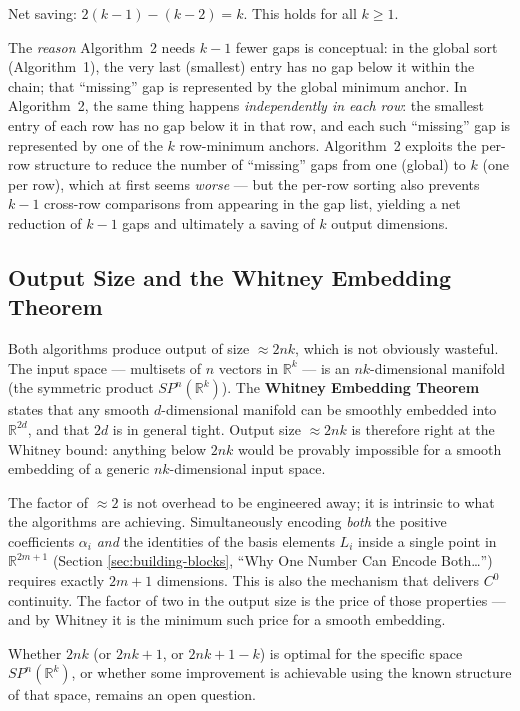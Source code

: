 \documentclass[11pt,a4paper]{article}
\newcommand{\R}{\mathbb{R}}
\begin{document}
\noindent
Net saving: $2(k-1) - (k-2) = k$.  This holds for all $k \ge 1$.

\medskip
\noindent
The \emph{reason} Algorithm~2 needs $k{-}1$ fewer gaps is conceptual: in the
global sort (Algorithm~1), the very last (smallest) entry has no gap below it
within the chain; that ``missing'' gap is represented by the global minimum
anchor.  In Algorithm~2, the same thing happens \emph{independently in each
row}: the smallest entry of each row has no gap below it in that row,
and each such ``missing'' gap is represented by one of the $k$ row-minimum
anchors.  Algorithm~2 exploits the per-row structure to reduce the number of
``missing'' gaps from one (global) to $k$ (one per row), which at first
seems \emph{worse} — but the per-row sorting also prevents $k{-}1$
cross-row comparisons from appearing in the gap list, yielding a net reduction
of $k{-}1$ gaps and ultimately a saving of $k$ output dimensions.

\subsection*{Output Size and the Whitney Embedding Theorem}

Both algorithms produce output of size $\approx 2nk$, which is not obviously
wasteful.  The input space — multisets of $n$ vectors in $\R^k$ — is an
$nk$-dimensional manifold (the symmetric product $SP^n(\R^k)$).  The
\textbf{Whitney Embedding Theorem} states that any smooth $d$-dimensional
manifold can be smoothly embedded into $\R^{2d}$, and that $2d$ is in general
tight.  Output size $\approx 2nk$ is therefore right at the Whitney bound:
anything below $2nk$ would be provably impossible for a smooth embedding of
a generic $nk$-dimensional input space.

The factor of $\approx 2$ is not overhead to be engineered away; it is
intrinsic to what the algorithms are achieving.  Simultaneously encoding
\emph{both} the positive coefficients $\alpha_i$ \emph{and} the identities of
the basis elements $L_i$ inside a single point in $\R^{2m+1}$ (Section
\ref{sec:building-blocks}, ``Why One Number Can Encode Both\ldots'') requires
exactly $2m+1$ dimensions.  This is also the mechanism that delivers
$C^0$ continuity.  The factor of two in the output size is the price of
those properties — and by Whitney it is the minimum such price for a smooth
embedding.

Whether $2nk$ (or $2nk+1$, or $2nk+1-k$) is optimal for the specific
space $SP^n(\R^k)$, or whether some improvement is achievable using
the known structure of that space, remains an open question.
\end{document}
